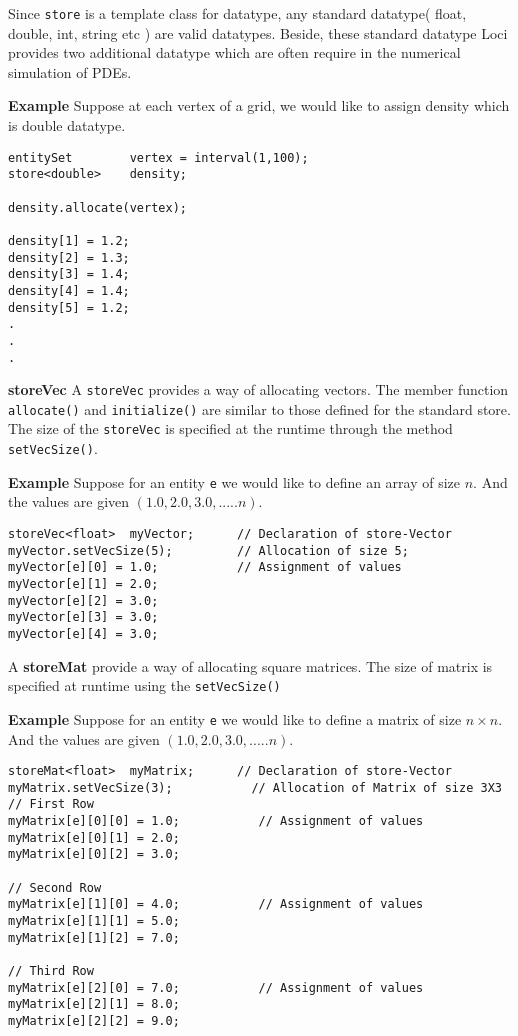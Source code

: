 \par Since {\tt store} is a template class for datatype, any standard datatype( 
float, double, int, string etc ) are valid datatypes. Beside, these standard datatype
Loci provides two additional datatype which are often require in the numerical simulation
of PDEs.

\par {\bf Example} Suppose at each vertex of a grid, we would like to assign density which
is double datatype. 

\begin{verbatim}
entitySet        vertex = interval(1,100);
store<double>    density;

density.allocate(vertex);

density[1] = 1.2;
density[2] = 1.3;
density[3] = 1.4;
density[4] = 1.4;
density[5] = 1.2;
.
.
.
\end{verbatim}
\par {\bf storeVec } A {\tt storeVec} provides a way of allocating vectors. The member 
function {\tt allocate()} and {\tt initialize()} are similar to those 
defined for the standard store. The size of the {\tt storeVec} is
specified at the runtime through the method {\tt setVecSize()}.
\par {\bf Example} Suppose for an entity {\tt e} we would like to define an array
of size ${n}$. And the values are given $(1.0,2.0,3.0,.....n)$. 
\begin{verbatim}
storeVec<float>  myVector;      // Declaration of store-Vector
myVector.setVecSize(5);         // Allocation of size 5;
myVector[e][0] = 1.0;           // Assignment of values 
myVector[e][1] = 2.0;
myVector[e][2] = 3.0;
myVector[e][3] = 3.0;
myVector[e][4] = 3.0;
\end{verbatim}
%
\par A {\bf storeMat} provide a way of allocating square matrices. The 
size of matrix is specified at runtime using the {\tt setVecSize()}
\par {\bf Example} Suppose for an entity {\tt e} we would like to define a matrix
of size ${n \times n}$. And the values are given $(1.0,2.0,3.0,.....n)$. 
%
\begin{verbatim}
storeMat<float>  myMatrix;      // Declaration of store-Vector
myMatrix.setVecSize(3);           // Allocation of Matrix of size 3X3
// First Row
myMatrix[e][0][0] = 1.0;           // Assignment of values 
myMatrix[e][0][1] = 2.0;
myMatrix[e][0][2] = 3.0;

// Second Row
myMatrix[e][1][0] = 4.0;           // Assignment of values 
myMatrix[e][1][1] = 5.0;
myMatrix[e][1][2] = 7.0;

// Third Row
myMatrix[e][2][0] = 7.0;           // Assignment of values 
myMatrix[e][2][1] = 8.0;
myMatrix[e][2][2] = 9.0;
\end{verbatim}
%
%
